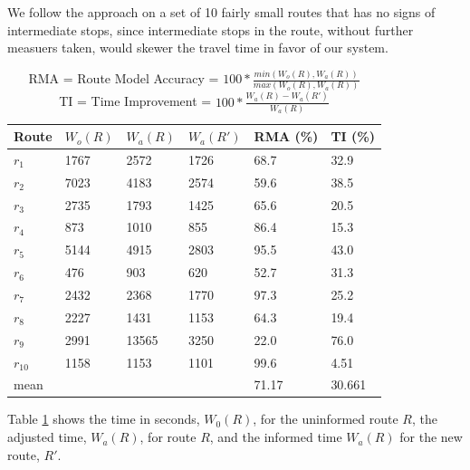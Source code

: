 We follow the approach on a set of 10 fairly small routes that has no signs of intermediate stops, since intermediate stops in the route, without further measuers taken, would skewer the travel time in favor of our system. 
\begin{table}[]
\centering
\begin{tabular}{llllll}
\textbf{Route} & \textbf{$W_o(R)$} & \textbf{$W_a(R)$}  & \textbf{$W_a(R')$} & \textbf{RMA (\%)} & \textbf{TI (\%)} \\ \hline
$r_1$          & 1767              & 2572               & 1726               & 68.7                         & 32.9 \\
$r_2$          & 7023              & 4183               & 2574               & 59.6                         & 38.5 \\
$r_3$          & 2735              & 1793               & 1425               & 65.6                         & 20.5 \\
$r_4$          & 873               & 1010               & 855                & 86.4                         & 15.3 \\
$r_5$          & 5144              & 4915               & 2803               & 95.5                         & 43.0 \\
$r_6$          & 476               & 903                & 620                & 52.7                         & 31.3 \\
$r_7$          & 2432              & 2368               & 1770               & 97.3                         & 25.2 \\
$r_8$          & 2227              & 1431               & 1153               & 64.3                         & 19.4 \\
$r_9$          & 2991              & 13565              & 3250               & 22.0                         & 76.0 \\
$r_{10}$       & 1158              & 1153               & 1101               & 99.6                         & 4.51 \\ \hline
mean       	   &                   &                    &                    & 71.17                        & 30.661
\end{tabular}
\caption{RMA = Route Model Accuracy = $100 * \frac{min(W_o(R), W_a(R))}{max(W_o(R), W_a(R))}$\\
	     TI = Time Improvement = $100 * \frac{W_a(R) - W_a(R')}{W_a(R)}$}
\label{tab:eval-results}
\end{table}
Table \ref{tab:eval-results} shows the time in seconds, $W_0(R)$, for the uninformed route $R$,  the adjusted time, $W_a(R)$, for route $R$, and the informed time $W_a(R)$ for the new route, $R'$.

